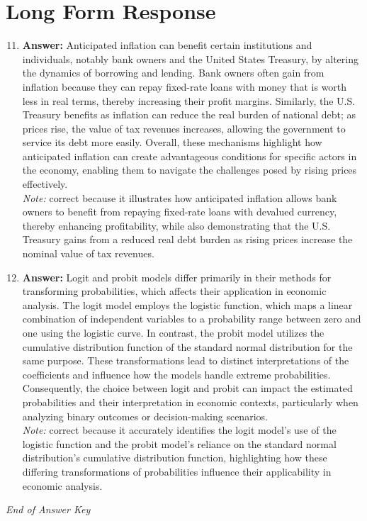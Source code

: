 \documentclass[12pt]{article}
\begin{document}
\section*{Long Form Response}
\begin{enumerate}[label=\arabic*.]
\setcounter{enumi}{10}
\item \textbf{Answer:} Anticipated inflation can benefit certain institutions and individuals, notably bank owners and the United States Treasury, by altering the dynamics of borrowing and lending. Bank owners often gain from inflation because they can repay fixed-rate loans with money that is worth less in real terms, thereby increasing their profit margins. Similarly, the U.S. Treasury benefits as inflation can reduce the real burden of national debt; as prices rise, the value of tax revenues increases, allowing the government to service its debt more easily. Overall, these mechanisms highlight how anticipated inflation can create advantageous conditions for specific actors in the economy, enabling them to navigate the challenges posed by rising prices effectively.
\\ \textit{Note:} correct because it illustrates how anticipated inflation allows bank owners to benefit from repaying fixed-rate loans with devalued currency, thereby enhancing profitability, while also demonstrating that the U.S. Treasury gains from a reduced real debt burden as rising prices increase the nominal value of tax revenues.
\item \textbf{Answer:} Logit and probit models differ primarily in their methods for transforming probabilities, which affects their application in economic analysis. The logit model employs the logistic function, which maps a linear combination of independent variables to a probability range between zero and one using the logistic curve. In contrast, the probit model utilizes the cumulative distribution function of the standard normal distribution for the same purpose. These transformations lead to distinct interpretations of the coefficients and influence how the models handle extreme probabilities. Consequently, the choice between logit and probit can impact the estimated probabilities and their interpretation in economic contexts, particularly when analyzing binary outcomes or decision-making scenarios.
\\ \textit{Note:} correct because it accurately identifies the logit model's use of the logistic function and the probit model's reliance on the standard normal distribution's cumulative distribution function, highlighting how these differing transformations of probabilities influence their applicability in economic analysis.
\end{enumerate}

\vfill
\noindent\textit{End of Answer Key}
\end{document}
